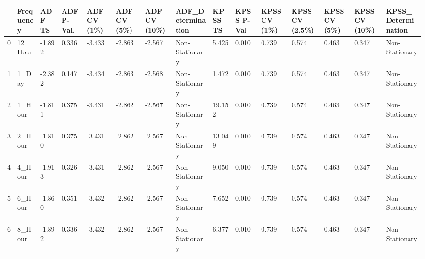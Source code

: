 \begin{tabular}{lllllllllllllll}
\toprule
 & Frequency & ADF TS & ADF P-Val. & ADF CV (1\%) & ADF CV (5\%) & ADF CV (10\%) & ADF_Determination & KPSS TS & KPSS P-Val & KPSS CV (1\%) & KPSS CV (2.5\%) & KPSS CV (5\%) & KPSS CV (10\%) & KPSS_Determination \\
\midrule
0 & 12_Hour & -1.892 & 0.336 & -3.433 & -2.863 & -2.567 & Non-Stationary & 5.425 & 0.010 & 0.739 & 0.574 & 0.463 & 0.347 & Non-Stationary \\
1 & 1_Day & -2.382 & 0.147 & -3.434 & -2.863 & -2.568 & Non-Stationary & 1.472 & 0.010 & 0.739 & 0.574 & 0.463 & 0.347 & Non-Stationary \\
2 & 1_Hour & -1.811 & 0.375 & -3.431 & -2.862 & -2.567 & Non-Stationary & 19.152 & 0.010 & 0.739 & 0.574 & 0.463 & 0.347 & Non-Stationary \\
3 & 2_Hour & -1.810 & 0.375 & -3.431 & -2.862 & -2.567 & Non-Stationary & 13.049 & 0.010 & 0.739 & 0.574 & 0.463 & 0.347 & Non-Stationary \\
4 & 4_Hour & -1.913 & 0.326 & -3.431 & -2.862 & -2.567 & Non-Stationary & 9.050 & 0.010 & 0.739 & 0.574 & 0.463 & 0.347 & Non-Stationary \\
5 & 6_Hour & -1.860 & 0.351 & -3.432 & -2.862 & -2.567 & Non-Stationary & 7.652 & 0.010 & 0.739 & 0.574 & 0.463 & 0.347 & Non-Stationary \\
6 & 8_Hour & -1.892 & 0.336 & -3.432 & -2.862 & -2.567 & Non-Stationary & 6.377 & 0.010 & 0.739 & 0.574 & 0.463 & 0.347 & Non-Stationary \\
\bottomrule
\end{tabular}

